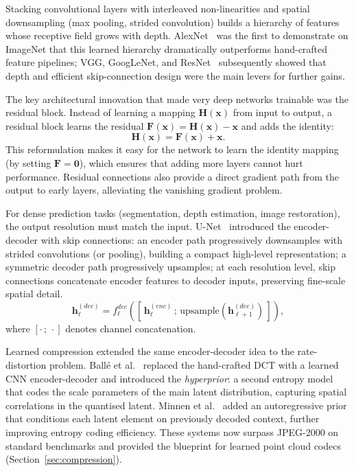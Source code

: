 Stacking convolutional layers with interleaved non-linearities and spatial
downsampling (max pooling, strided convolution) builds a hierarchy of features
whose receptive field grows with depth.
AlexNet~\cite{krizhevsky2012alexnet} was the first to demonstrate on ImageNet that this learned
hierarchy dramatically outperforms hand-crafted feature pipelines; VGG,
GoogLeNet, and ResNet~\cite{he2016deep} subsequently showed that depth and
efficient skip-connection design were the main levers for further gains.

The key architectural innovation that made very deep networks trainable was
the residual block.
Instead of learning a mapping $\mathbf{H}(\mathbf{x})$ from input to output,
a residual block learns the residual $\mathbf{F}(\mathbf{x}) = \mathbf{H}(\mathbf{x}) - \mathbf{x}$
and adds the identity:
\begin{equation}
  \mathbf{H}(\mathbf{x}) = \mathbf{F}(\mathbf{x}) + \mathbf{x}.
\end{equation}
This reformulation makes it easy for the network to learn the identity mapping
(by setting $\mathbf{F} = \mathbf{0}$), which ensures that adding more layers
cannot hurt performance.
Residual connections also provide a direct gradient path from the output to
early layers, alleviating the vanishing gradient problem.

For dense prediction tasks (segmentation, depth estimation, image restoration),
the output resolution must match the input.
U-Net~\cite{ronneberger2015unet} introduced the encoder-decoder with skip
connections: an encoder path progressively downsamples with strided
convolutions (or pooling), building a compact high-level representation;
a symmetric decoder path progressively upsamples; at each resolution level,
skip connections concatenate encoder features to decoder inputs, preserving
fine-scale spatial detail.
\begin{equation}
  \mathbf{h}^{(dec)}_\ell = f_\ell^{dec}\!\left(
    [\,\mathbf{h}^{(enc)}_\ell\, ;\, \text{upsample}(\mathbf{h}^{(dec)}_{\ell+1})\,]\right),
\end{equation}
where $[\cdot\,;\,\cdot]$ denotes channel concatenation.

Learned compression extended the same encoder-decoder idea to the
rate-distortion problem.
Ballé et al.~\cite{balle2018variational} replaced the hand-crafted DCT
with a learned CNN encoder-decoder and introduced the \emph{hyperprior}:
a second entropy model that codes the scale parameters of the main latent
distribution, capturing spatial correlations in the quantised latent.
Minnen et al.~\cite{minnen2018joint} added an autoregressive prior that
conditions each latent element on previously decoded context, further
improving entropy coding efficiency.
These systems now surpass JPEG-2000 on standard benchmarks and provided
the blueprint for learned point cloud codecs (Section~\ref{sec:compression}).


